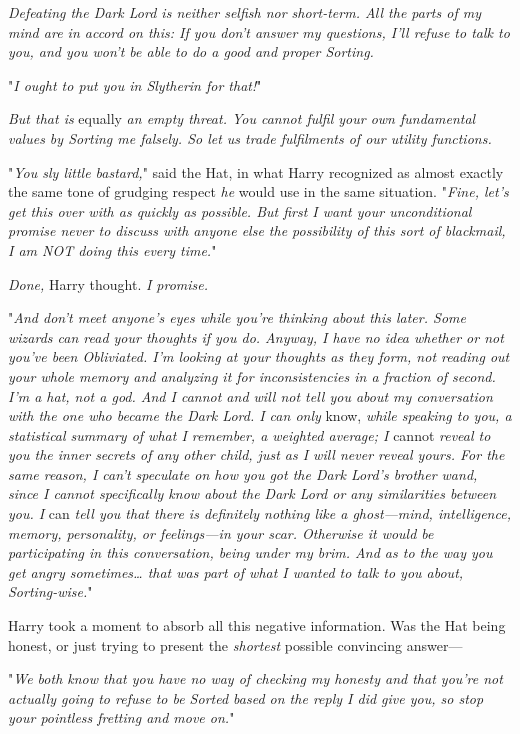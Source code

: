 \emph{Defeating the Dark Lord is neither selfish nor short-term. All the parts
of my mind are in accord on this: If you don't answer my questions, I'll refuse
to talk to you, and you won't be able to do a good and proper Sorting.}

"\emph{I ought to put you in Slytherin for that!}"

\emph{But that is} equally \emph{an empty threat. You cannot fulfil your own
fundamental values by Sorting me falsely. So let us trade fulfilments of our
utility functions.}

"\emph{You sly little bastard,}" said the Hat, in what Harry recognized as
almost exactly the same tone of grudging respect \emph{he} would use in the
same situation. "\emph{Fine, let's get this over with as quickly as possible.
But first I want your unconditional promise never to discuss with anyone else
the possibility of this sort of blackmail, I am NOT doing this every time.}"

\emph{Done,} Harry thought. \emph{I promise.}

"\emph{And don't meet anyone's eyes while you're thinking about this later.
Some wizards can read your thoughts if you do. Anyway, I have no idea whether
or not you've been Obliviated. I'm looking at your thoughts as they form, not
reading out your whole memory and analyzing it for inconsistencies in a
fraction of second. I'm a hat, not a god. And I cannot and will not tell you
about my conversation with the one who became the Dark Lord. I can only}
know, \emph{while speaking to you, a statistical summary of what I remember, a
weighted average; I} cannot \emph{reveal to you the inner secrets of any other
child, just as I will never reveal yours. For the same reason, I can't
speculate on how you got the Dark Lord's brother wand, since I cannot
specifically know about the Dark Lord or any similarities between you. I}
can \emph{tell you that there is definitely nothing like a ghost---mind,
intelligence, memory, personality, or feelings---in your scar. Otherwise it
would be participating in this conversation, being under my brim. And as to the
way you get angry sometimes{\ldots} that was part of what I wanted to talk to
you about, Sorting-wise.}"

Harry took a moment to absorb all this negative information. Was the Hat being
honest, or just trying to present the \emph{shortest} possible convincing
answer---

"\emph{We both know that you have no way of checking my honesty and that you're
not actually going to refuse to be Sorted based on the reply I did give you, so
stop your pointless fretting and move on.}"

